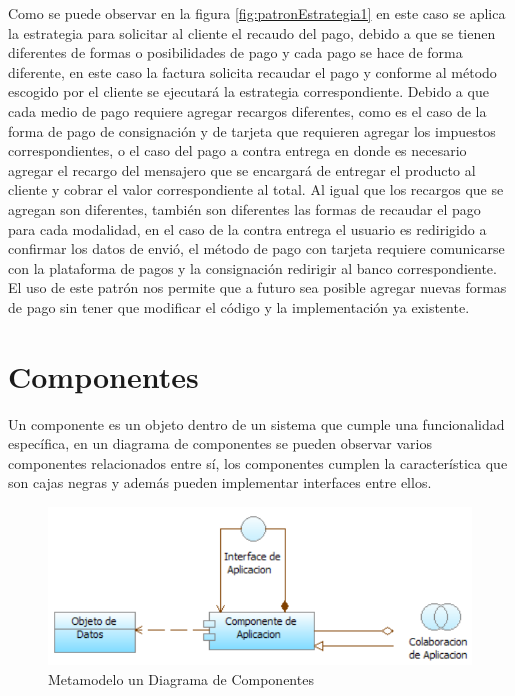 Como se puede observar en la figura \ref{fig:patronEstrategia1} en este caso se aplica la estrategia para solicitar al cliente el recaudo del pago, debido a que se tienen diferentes de formas o posibilidades de pago y cada pago se hace de forma diferente, en este caso la factura solicita recaudar el  pago y conforme al método escogido por el cliente se ejecutará la estrategia correspondiente.\newline
Debido a que cada medio de pago requiere agregar recargos diferentes, como es el caso de la forma de pago de consignación y de tarjeta que requieren agregar los impuestos correspondientes, o el caso del pago a contra entrega en donde es necesario agregar el recargo del mensajero que se encargará de entregar el producto al cliente y cobrar el valor correspondiente al total.\newline
Al igual que los recargos que se agregan son diferentes, también son diferentes las formas de recaudar el pago para cada modalidad, en el caso de la contra entrega el usuario es redirigido a confirmar los datos de envió, el método de pago con tarjeta requiere comunicarse con la plataforma de pagos y la consignación redirigir al banco correspondiente.\newline
El uso de este patrón nos permite que a futuro sea posible agregar nuevas formas de pago sin tener que modificar el código y la implementación ya existente.
\newpage

\section{Componentes}
Un componente es un objeto dentro de un sistema que cumple una funcionalidad específica, en un diagrama de componentes se pueden observar varios componentes relacionados entre sí, los componentes cumplen la característica que son cajas negras y además pueden implementar interfaces entre ellos.

\begin{figure}[th!]
	\centering
	\includegraphics[width=0.7\linewidth]{arquitectura/imagenes/modeloEstructuraAplicacion}
	\caption{Metamodelo un Diagrama de Componentes}
	\label{fig:metamodeloComponentes}
\end{figure}

